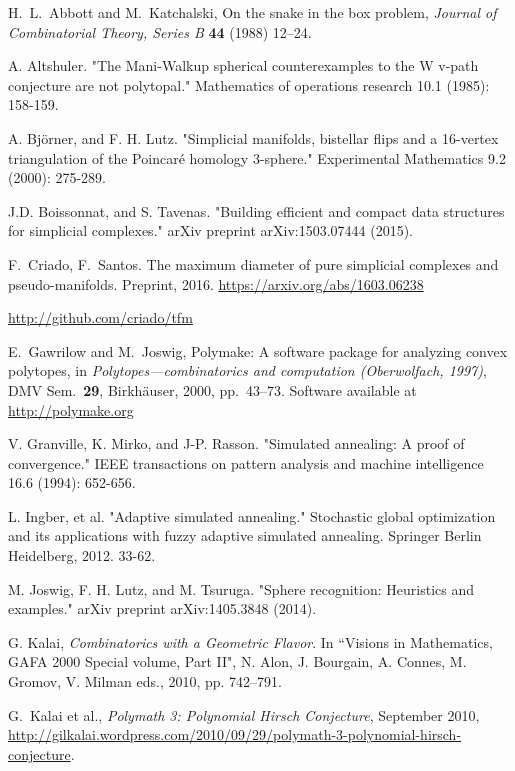 \documentclass[12pt,a4paper]{article}
\theoremstyle{plain}
\theoremstyle{definition}
\begin{document}
\begin{thebibliography}{99}
H.~L.~Abbott and M.~Katchalski, On the snake in the box problem, \emph{Journal of Combinatorial Theory, Series B} {\bf 44} (1988) 12--24.

  A. Altshuler. "The Mani-Walkup spherical counterexamples to the W v-path conjecture are not polytopal." Mathematics of operations research 10.1 (1985): 158-159.

  A. Björner, and F. H. Lutz. "Simplicial manifolds, bistellar flips and a 16-vertex triangulation of the Poincaré homology 3-sphere." Experimental Mathematics 9.2 (2000): 275-289.

  J.D. Boissonnat, and S. Tavenas. "Building efficient and compact data structures for simplicial complexes." arXiv preprint arXiv:1503.07444 (2015).

  F.~Criado, F.~Santos.
  The maximum diameter of pure simplicial complexes and pseudo-manifolds.
  Preprint, 2016.
  \url{https://arxiv.org/abs/1603.06238}

  \url{http://github.com/criado/tfm}

E.~Gawrilow and M.~Joswig,
Polymake: A software package for analyzing convex polytopes,
in \emph{Polytopes---combinatorics and computation (Oberwolfach, 1997)},
DMV Sem.~\textbf{29}, Birkh\"auser, 2000, pp.~43--73.
Software available at \url{http://polymake.org}

  V. Granville, K. Mirko, and J-P. Rasson. "Simulated annealing: A proof of convergence." IEEE transactions on pattern analysis and machine intelligence 16.6 (1994): 652-656.

  L. Ingber, et al. "Adaptive simulated annealing." Stochastic global optimization and its applications with fuzzy adaptive simulated annealing. Springer Berlin Heidelberg, 2012. 33-62.

  M. Joswig, F. H. Lutz, and M. Tsuruga. "Sphere recognition: Heuristics and examples." arXiv preprint arXiv:1405.3848 (2014).

G. Kalai, \emph{Combinatorics with a Geometric Flavor}.
In ``Visions in Mathematics, GAFA 2000 Special volume, Part II",
N. Alon, J. Bourgain, A. Connes, M. Gromov, V. Milman eds., 2010, pp. 742--791.

G.~Kalai et al., \emph{Polymath 3: Polynomial Hirsch Conjecture}, September 2010,
\href{http://gilkalai.wordpress.com/2010/09/29/polymath-3-polynomial-hirsch-conjecture}
{http://gilkalai.wordpress.com/2010/09/29/polymath-3-polynomial-hirsch-conjecture}.


\end{thebibliography}
\end{document}
